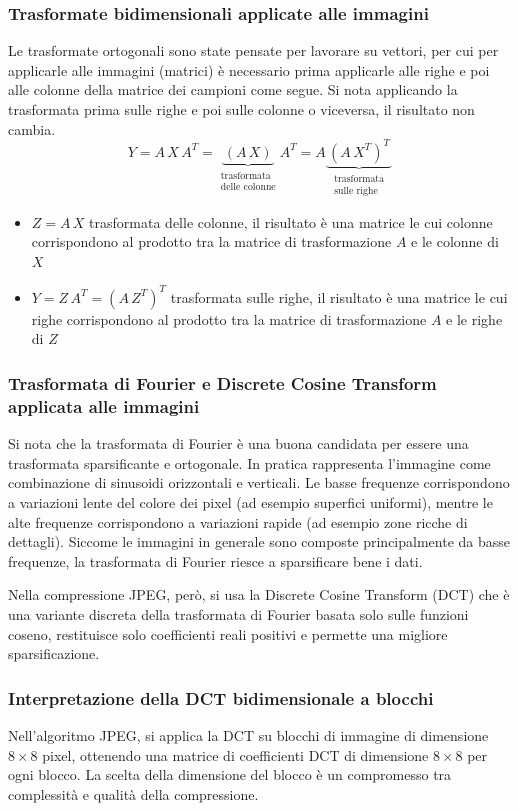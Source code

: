 \subsubsection*{Trasformate bidimensionali applicate alle immagini}
Le trasformate ortogonali sono state pensate per lavorare su vettori, per cui per applicarle alle immagini (matrici) è
necessario prima applicarle alle righe e poi alle colonne della matrice dei campioni come segue. Si nota applicando la
trasformata prima sulle righe e poi sulle colonne o viceversa, il risultato non cambia.
\[Y = A \, X \, A^T = \underbrace{\, (A \, X) \,}_{\substack{\text{trasformata} \\ \text{delle colonne}}} \!\!\!\! A^T = A \underbrace{\, (A \,X^T)^T \,}_{\substack{\text{trasformata} \\ \text{sulle righe}}}\]
\begin{itemize}
	\item \(Z = A \, X\) trasformata delle colonne, il risultato è una matrice le cui colonne corrispondono al prodotto tra
	la matrice di trasformazione \(A\) e le colonne di \(X\)
	\item \(Y = Z \, A^T = (A \, Z^T)^T\) trasformata sulle righe, il risultato è una matrice le cui righe corrispondono
	al prodotto tra la matrice di trasformazione \(A\) e le righe di \(Z\)
\end{itemize}

\subsubsection*{Trasformata di Fourier e Discrete Cosine Transform applicata alle immagini}
Si nota che la trasformata di Fourier è una buona candidata per essere una trasformata sparsificante e ortogonale. In pratica
rappresenta l'immagine come combinazione di sinusoidi orizzontali e verticali. Le basse frequenze corrispondono a variazioni
lente del colore dei pixel (ad esempio superfici uniformi), mentre le alte frequenze corrispondono a variazioni rapide (ad
esempio zone ricche di dettagli). Siccome le immagini in generale sono composte principalmente da basse frequenze, la
trasformata di Fourier riesce a sparsificare bene i dati.

Nella compressione JPEG, però, si usa la Discrete Cosine Transform (DCT) che è una variante discreta della trasformata di Fourier
basata solo sulle funzioni coseno, restituisce solo coefficienti reali positivi e permette una migliore sparsificazione.

\subsubsection*{Interpretazione della DCT bidimensionale a blocchi}
Nell'algoritmo JPEG, si applica la DCT su blocchi di immagine di dimensione \(8 \times 8\) pixel, ottenendo una matrice di
coefficienti DCT di dimensione \(8 \times 8\) per ogni blocco. La scelta della dimensione del blocco è un compromesso tra
complessità e qualità della compressione.

